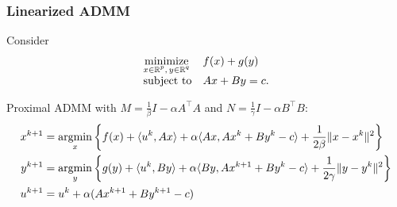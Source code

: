 \documentclass[10pt,mathserif]{beamer}
\begin{document}
%
%
%

\begin{frame}
\frametitle{Linearized ADMM}
Consider 
\[
\begin{array}{ll}
\underset{\substack{x\in \mathbb{R}^p,\,y\in \mathbb{R}^q}}{\mbox{minimize}}&f(x)+g(y)\\
\mbox{subject to}&Ax+By=c.
\end{array}
\]


\vspace{0.2in}

Proximal ADMM with $M=\frac{1}{\beta}I-\alpha A^\intercal A$ and $N=\frac{1}{\gamma}I-\alpha B^\intercal B$:
\begin{align*}
x^{k+1}&=\operatorname*{argmin}_{x}\left\{
    f(x)+\langle  u ^{k},Ax\rangle+
    \alpha \langle Ax,Ax^k+By^k-c\rangle
    +\frac{1}{2\beta}\|x-x^{k}\|^2
    \right\}\\
y^{k+1}&=\operatorname*{argmin}_{y}\left\{
    g(y)+\langle  u ^k,By\rangle +
    \alpha \langle By,Ax^{k+1}+By^k-c\rangle
    +\frac{1 }{2\gamma}\|y-y^{k}\|^2
    \right\}\\
 u ^{k+1}&= u ^{k}+\alpha(Ax^{k+1}+By^{k+1}-c)
\end{align*}
\end{frame}
\end{document}
